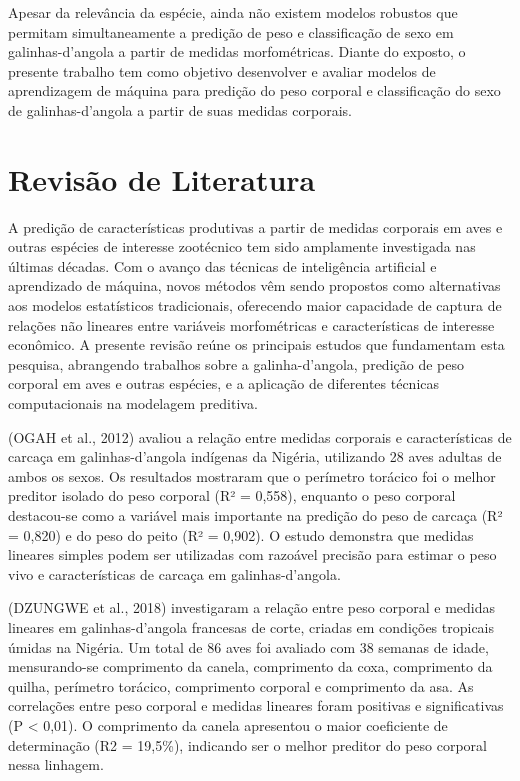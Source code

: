 \documentclass[12pt]{article}
\begin{document}
Apesar da relevância da espécie, ainda não existem modelos robustos que
permitam simultaneamente a predição de peso e classificação de sexo em
galinhas-d'angola a partir de medidas morfométricas. Diante do exposto, o
presente trabalho tem como objetivo desenvolver e avaliar modelos de
aprendizagem de máquina para predição do peso corporal e classificação do sexo
de galinhas-d'angola a partir de suas medidas corporais.

\section{Revisão de Literatura}

A predição de características produtivas a partir de medidas corporais em aves e
outras espécies de interesse zootécnico tem sido amplamente investigada nas
últimas décadas. Com o avanço das técnicas de inteligência artificial e
aprendizado de máquina, novos métodos vêm sendo propostos como alternativas aos
modelos estatísticos tradicionais, oferecendo maior capacidade de captura de
relações não lineares entre variáveis morfométricas e características de
interesse econômico. A presente revisão reúne os principais estudos que
fundamentam esta pesquisa, abrangendo trabalhos sobre a galinha-d'angola,
predição de peso corporal em aves e outras espécies, e a aplicação de
diferentes técnicas computacionais na modelagem preditiva.

(OGAH et al., 2012) avaliou a relação entre medidas corporais e características
de carcaça em galinhas-d'angola indígenas da Nigéria, utilizando 28 aves
adultas de ambos os sexos. Os resultados mostraram que o perímetro torácico foi
o melhor preditor isolado do peso corporal (R² = 0,558), enquanto o peso
corporal destacou-se como a variável mais importante na predição do peso de
carcaça (R² = 0,820) e do peso do peito (R² = 0,902). O estudo demonstra que
medidas lineares simples podem ser utilizadas com razoável precisão para
estimar o peso vivo e características de carcaça em galinhas-d'angola.

(DZUNGWE et al., 2018) investigaram a relação entre peso corporal e medidas
lineares em galinhas-d'angola francesas de corte, criadas em condições
tropicais úmidas na Nigéria. Um total de 86 aves foi avaliado com 38 semanas de
idade, mensurando-se comprimento da canela, comprimento da coxa, comprimento da
quilha, perímetro torácico, comprimento corporal e comprimento da asa. As
correlações entre peso corporal e medidas lineares foram positivas e
significativas (P < 0,01). O comprimento da canela apresentou o maior
coeficiente de determinação (R2 = 19,5\%), indicando ser o melhor preditor do
peso corporal nessa linhagem.
\end{document}
